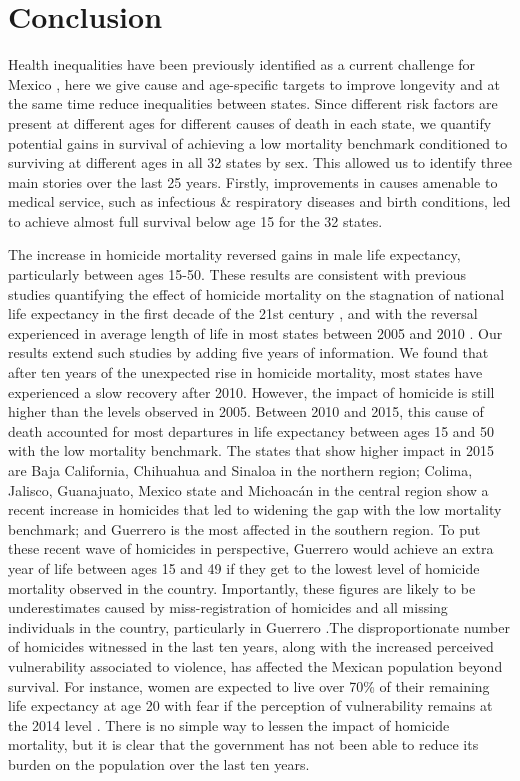 \documentclass{bmcart}
\begin{document}
\section*{Conclusion}

Health inequalities have been previously identified as a current challenge for Mexico \cite{gomez2016dissonant,gutierrez2016health}, here we give cause and age-specific targets to improve longevity and at the same time reduce inequalities between states. Since different risk factors are present at different ages for different causes of death in each state, we quantify potential gains in survival of achieving a low mortality benchmark conditioned to surviving at different ages in all 32 states by sex. This allowed us to identify three main stories over the last 25 years. Firstly, improvements in causes amenable to medical service, such as infectious \& respiratory diseases and birth conditions, led to achieve almost full survival below age 15 for the 32 states. 

The increase in homicide mortality reversed gains in male life expectancy, particularly between ages 15-50. These results are consistent with previous studies quantifying the effect of homicide mortality on the stagnation of national life expectancy in the first decade of the 21st century \cite{canudas2014}, and with the reversal experienced in average length of life in most states between 2005 and 2010 \cite{Aburto2015}. Our results extend such studies by adding five years of information. We found that after ten years of the unexpected rise in homicide mortality, most states have experienced a slow recovery after 2010. However, the impact of homicide is still higher than the levels observed in 2005. Between 2010 and 2015, this cause of death accounted for most departures in life expectancy between ages 15 and 50 with the low mortality benchmark. The states that show higher impact in 2015 are Baja California, Chihuahua and Sinaloa in the northern region; Colima, Jalisco, Guanajuato, Mexico state and Michoac\'an in the central region show a recent increase in homicides that led to widening the gap with the low mortality benchmark; and Guerrero is the most affected in the southern region. To put these recent wave of homicides in perspective, Guerrero would achieve an extra year of life between ages 15 and 49 if they get to the lowest level of homicide mortality observed in the country. Importantly, these figures are likely to be underestimates caused by miss-registration of homicides and all missing individuals in the country, particularly in Guerrero \cite{HRW2011,wright2017epistemological}.The disproportionate number of homicides witnessed in the last ten years, along with the increased perceived vulnerability associated to violence, has affected the Mexican population beyond survival. For instance, women are expected to live over 70\% of their remaining life expectancy at age 20 with fear if the perception of vulnerability remains at the 2014 level  \cite{canudas2017Mexico}. There is no simple way to lessen the impact of homicide mortality, but it is clear that the government has not been able to reduce its burden on the population over the last ten years. 
\end{document}
